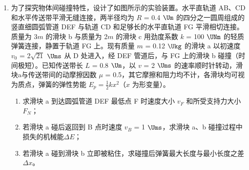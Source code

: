 \documentclass[\gkver]{gaokaozhenti}
\begin{document}
\begin{enumerate}
\item
为了探究物体间碰撞特性，设计了如图所示的实验装置。水平直轨道 AB、CD 和水平传送带平滑无缝连接，两半径均为 $R$ = 0.4 $\Um$ 的四分之一圆周组成的竖直细圆弧管道 DEF 与轨道 CD 和足够长的水平直轨道 FG 平滑相切连接。质量为 3$m$ 的滑块 b 与质量为 2$m$ 的滑块 c 用劲度系数 $k$ = 100 $\UNm$ 的轻质弹簧连接，静置于轨道 FG 上。现有质量 $m$ = 0.12 $\Ukg$ 的滑块 a 以初速度 $v_{0}$ = 2$\sqrt {21} $ $\Ums$ 从 D 处进入，经 DEF 管道后，与 FG 上的滑块 b 碰撞（时间极短）。已知传送带长 $L$ = 0.8 $\Um$，以 $v$ = 2 $\Ums$ 的速率顺时针转动，滑块a与传送带间的动摩擦因数 $\mu$ = 0.5，其它摩擦和阻力均不计，各滑块均可视为质点，弹簧的弹性势能 $E_{p} = \frac{1}{2}kx^{2}$（$x$ 为形变量）。
\begin{enumerate}
	\item
	求滑块 a 到达圆弧管道 DEF 最低点 F 时速度大小 $v_{F}$ 和所受支持力大小 $F_{N}$；
	\item
	若滑块 a 碰后返回到 B 点时速度 $v_{B}$ = 1 $\Ums$，求滑块 a、b 碰撞过程中损失的机械能$\Delta E$；
	\item
	若滑块 a 碰到滑块 b 立即被粘住，求碰撞后弹簧最大长度与最小长度之差 $\Delta x$。
\end{enumerate}
\end{enumerate}
\end{document}
